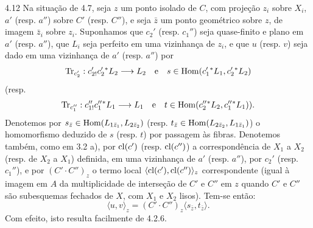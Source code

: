 \begin{statement}{4.12}
Na situação de 4.7, seja $z$ um ponto isolado de $C$, com projeção $z_i$ sobre $X_i$, $a'$ (resp. $a''$) sobre $C'$ (resp. $C''$), e seja $\bar z$ um ponto geométrico sobre $z$, de imagem $\bar z_i$ sobre $z_i$. Suponhamos que $c_2'$ (resp. $c_1''$) seja quase-finito e plano em $a'$ (resp. $a''$), que $L_i$ seja perfeito em uma vizinhança de $z_i$, e que $u$ (resp. $v$) seja dado em uma vizinhança de $a'$ (resp. $a''$) por
\[
\operatorname{Tr}_{c_2'}:c_{2!}'c_2'{}^*L_2\longrightarrow L_2
\quad\text{e}\quad
s\in\operatorname{Hom}(c_1'{}^*L_1,c_2'{}^*L_2)
\]
(resp.
\[
\operatorname{Tr}_{c_1''}:c_{1!}''c_1''{}^*L_1\longrightarrow L_1
\quad\text{e}\quad
t\in\operatorname{Hom}(c_2''{}^*L_2,c_1''{}^*L_1)).
\]
Denotemos por $s_{\bar z}\in\operatorname{Hom}(L_{1\bar z_1},L_{2\bar z_2})$ (resp. $t_{\bar z}\in\operatorname{Hom}(L_{2\bar z_2},L_{1\bar z_1})$) o homomorfismo deduzido de $s$ (resp. $t$) por passagem às fibras. Denotemos também, como em 3.2 a), por $\operatorname{cl}(c')$ (resp. $\operatorname{cl}(c'')$) a correspondência de $X_1$ a $X_2$ (resp. de $X_2$ a $X_1$) definida, em uma vizinhança de $a'$ (resp. $a''$), por $c_2'$ (resp. $c_1''$), e por $(C'\!\cdot C'')_z$ o termo local $\langle\operatorname{cl}(c'),\operatorname{cl}(c'')\rangle_z$ correspondente (igual à imagem em $A$ da multiplicidade de interseção de $C'$ e $C''$ em $z$ quando $C'$ e $C''$ são subesquemas fechados de $X$, com $X_1$ e $X_2$ lisos). Tem-se então:
\begin{equation}
\tag{4.12.1}
\langle u,v\rangle_z=(C'\!\cdot C'')_z\langle s_{\bar z},t_{\bar z}\rangle.
\end{equation}
Com efeito, isto resulta facilmente de 4.2.6.
\end{statement}

